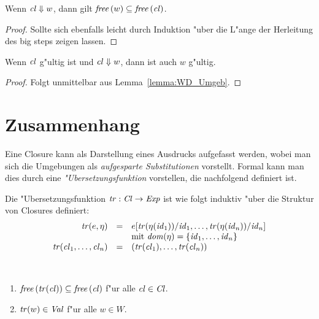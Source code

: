 \documentclass[12pt,fleqn,a4paper]{article}
\newcommand{\Cl}{\name{Cl}}
\newcommand{\cl}{\name{cl}}
\begin{document}
\begin{lemma} \label{lemma:WD_Umgeb}
  Wenn $\cl \Downarrow w$, dann gilt $\free{w} \subseteq \free{\cl}$.
\end{lemma}

\begin{proof}
  Sollte sich ebenfalls leicht durch Induktion "uber die L"ange der Herleitung des big steps zeigen lassen.
\end{proof}

\begin{corollary}
  Wenn $\cl$ g"ultig ist und $\cl \Downarrow w$, dann ist auch $w$ g"ultig.
\end{corollary}

\begin{proof}
  Folgt unmittelbar aus Lemma~\ref{lemma:WD_Umgeb}.
\end{proof}

\section{Zusammenhang}

Eine Closure kann als Darstellung eines Ausdrucks aufgefasst werden, wobei man sich die Umgebungen als
\emph{aufgesparte Substitutionen} vorstellt. Formal kann man dies durch eine \emph{"Ubersetzungsfunktion}
vorstellen, die nachfolgend definiert ist.

\begin{definition}["Ubersetzungsfunktion]
  Die "Ubersetzungsfunktion $\name{tr}:\Cl \to \Exp$ ist wie folgt induktiv "uber die Struktur von Closures
  definiert:
  \[\begin{array}{rcl}
    \tr{e,\eta} &=& e[\tr{\eta(\id_1)}/\id_1,\ldots,\tr{\eta(\id_n)}/\id_n] \\
    && \text{mit } \dom{\eta} = \{\id_1,\ldots,\id_n\} \\
    \tr{\cl_1,\ldots,\cl_n} &=& (\tr{\cl_1},\ldots,\tr{\cl_n}) \\
  \end{array}\]
\end{definition}

\begin{lemma} \
  \begin{enumerate}
  \item $\free{\tr{\cl}} \subseteq \free{\cl}$ f"ur alle $\cl \in \Cl$.
  \item ${\text{\it tr\/}}(w) \in {\text{\it Val\/}}$ f"ur alle $w \in W$.
  \end{enumerate}
\end{lemma}
\end{document}
